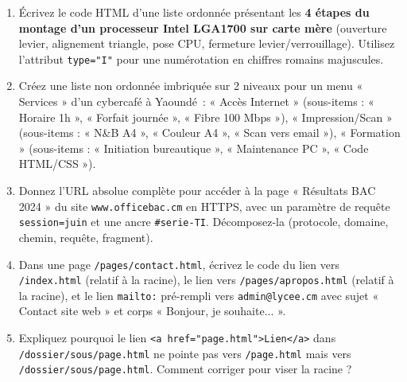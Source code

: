 \documentclass[11pt]{article}
\begin{document}
\begin{exercice}
\begin{enumerate}
    \item Écrivez le code HTML d'une liste ordonnée présentant les \textbf{4 étapes du montage d'un processeur Intel LGA1700 sur carte mère} (ouverture levier, alignement triangle, pose CPU, fermeture levier/verrouillage). Utilisez l'attribut \texttt{type="I"} pour une numérotation en chiffres romains majuscules.
    \item Créez une liste non ordonnée imbriquée sur 2 niveaux pour un menu « Services » d'un cybercafé à Yaoundé~: « Accès Internet » (sous-items : « Horaire 1h », « Forfait journée », « Fibre 100 Mbps »), « Impression/Scan » (sous-items : « N\&B A4 », « Couleur A4 », « Scan vers email »), « Formation » (sous-items : « Initiation bureautique », « Maintenance PC », « Code HTML/CSS »).
    \item Donnez l'URL absolue complète pour accéder à la page « Résultats BAC 2024 » du site \texttt{www.officebac.cm} en HTTPS, avec un paramètre de requête \texttt{session=juin} et une ancre \texttt{\#serie-TI}. Décomposez-la (protocole, domaine, chemin, requête, fragment).
    \item Dans une page \texttt{/pages/contact.html}, écrivez le code du lien vers \texttt{/index.html} (relatif à la racine), le lien vers \texttt{/pages/apropos.html} (relatif à la racine), et le lien \texttt{mailto:} pré-rempli vers \texttt{admin@lycee.cm} avec sujet « Contact site web » et corps « Bonjour, je souhaite... ».
    \item Expliquez pourquoi le lien \texttt{<a href="page.html">Lien</a>} dans \texttt{/dossier/sous/page.html} ne pointe pas vers \texttt{/page.html} mais vers \texttt{/dossier/sous/page.html}. Comment corriger pour viser la racine ?
\end{enumerate}
\end{exercice}
\end{document}
